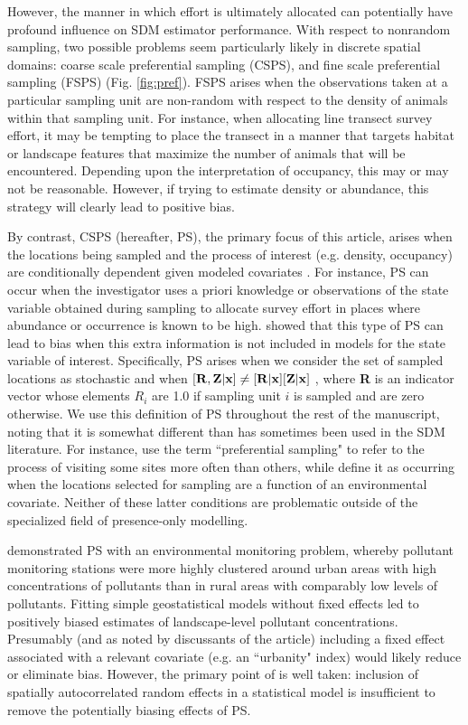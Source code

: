 \documentclass[times,mee,doublespace,]{besauth2}
\begin{document}
However, the manner in which effort is ultimately allocated can potentially have profound influence on SDM estimator performance.  With respect to nonrandom sampling, two possible problems seem particularly likely in discrete spatial domains: coarse scale preferential sampling (CSPS), and fine scale preferential sampling (FSPS) (Fig. \ref{fig:pref}).  FSPS arises when the observations taken at a  particular sampling unit are non-random with respect to the density of animals within that sampling unit.  For instance, when allocating line transect survey effort, it may be tempting to place the transect in a manner that targets habitat or landscape features that maximize the number of animals that will be encountered.  Depending upon the interpretation of occupancy, this may or may not be reasonable.  However, if trying to estimate density or abundance, this strategy will clearly lead to positive bias.

By contrast, CSPS (hereafter, PS), the primary focus of this article, arises when the locations being sampled and the process of interest (e.g. density, occupancy) are conditionally dependent given modeled covariates \citep{DiggleEtAl2010}.  For instance, PS can occur when the investigator uses a priori knowledge or observations of the state variable obtained during sampling to allocate survey effort in places where abundance or occurrence is known to be high. \citet{DiggleEtAl2010} showed that this type of PS can lead to bias when this extra information is not included in models for the state variable of interest.  Specifically, PS arises when we consider the set of sampled locations as stochastic and when $[{\bf R},{\bf Z} | {\bf x}] \neq [{\bf R}|{\bf x}][{\bf Z}|{\bf x}]$ \citep{DiggleEtAl2010}, where \textbf{R} is an indicator vector whose elements $R_i$ are 1.0 if sampling unit $i$ is sampled and are zero otherwise.  We use this definition of PS throughout the rest of the manuscript, noting that it is somewhat different than has sometimes been used in the SDM literature.  For instance, \citet{MerckxEtAl2011} use the term ``preferential sampling" to refer to the process of visiting some sites more often than others, while \citet{ManceurKuhn2014} define it as occurring when the locations selected for sampling are a function of an environmental covariate.  Neither of these latter conditions are problematic outside of the specialized field of presence-only modelling.

\citet{DiggleEtAl2010} demonstrated PS with an environmental monitoring problem, whereby pollutant monitoring stations were more highly clustered around urban areas with high concentrations of pollutants than in rural areas with comparably low levels of pollutants.  Fitting simple geostatistical models without fixed effects led to positively biased estimates of landscape-level pollutant concentrations.  Presumably (and as noted by discussants of the article) including a fixed effect associated with a relevant covariate (e.g. an ``urbanity" index) would likely reduce or eliminate bias.  However, the primary point of \citet{DiggleEtAl2010} is well taken: inclusion of spatially autocorrelated random effects in a statistical model is insufficient to remove the potentially biasing effects of PS.
\end{document}
